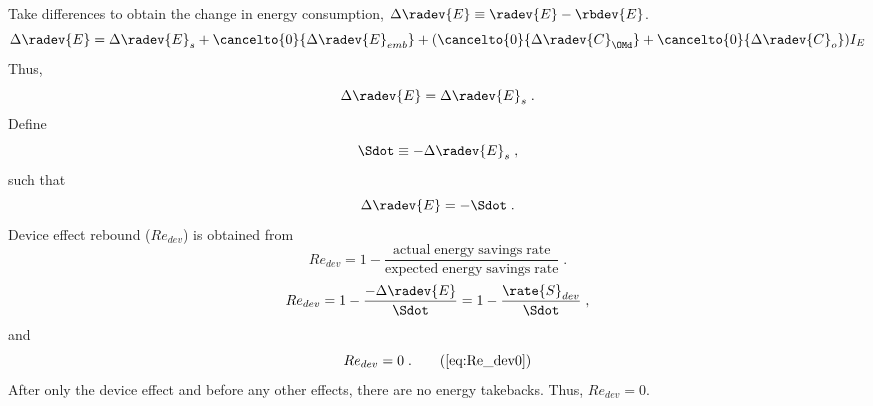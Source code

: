 \begin{landscape}
{Take differences to obtain the change in energy consumption, $\Delta \radev{E} \equiv \radev{E} - \rbdev{E}$.
%
\begin{equation}
  \Delta \radev{E} = \Delta \radev{E}_s
                     + \cancelto{0}{\Delta \radev{E}_{emb}} 
                     + (\cancelto{0}{\Delta \radev{C}_{\OMd}} 
                     + \cancelto{0}{\Delta \radev{C}_o}) I_E
\end{equation}
%
Thus, 
%
\begin{equation}
\Delta \radev{E} = \Delta \radev{E}_s \; .
\end{equation}
%
Define
%
\begin{equation}
\Sdot \equiv -\Delta \radev{E}_s \; ,
\end{equation}
%
such that
%
\begin{equation}
\Delta \radev{E} = -\Sdot \; .
\end{equation}
%
Device effect rebound ($Re_{dev}$) is obtained from 
%
\begin{equation}
Re_{dev} = 1 - \frac{\mathrm{actual \; energy \; savings \; rate}}{\mathrm{expected \; energy \; savings \; rate}} \; .
\end{equation}
%
\begin{equation}
Re_{dev} = 1 - \frac{-\Delta \radev{E}}{\Sdot} = 1 - \frac{\rate{S}_{dev}}{\Sdot} \; ,
\end{equation}
%
and
%
\begin{equation}
Re_{dev} = 0 \; . \tag{\ref{eq:Re_dev0}}
\end{equation}
%
After only the device effect and before any other effects, 
there are no energy takebacks. 
Thus, $Re_{dev} = 0$.
%
}
{
~
    
}
\end{landscape}

